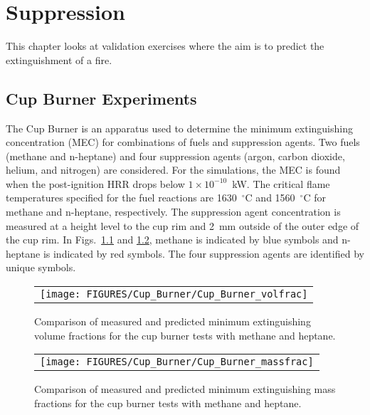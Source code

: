 
\chapter{Suppression}

This chapter looks at validation exercises where the aim is to predict the extinguishment of a fire.

\section{Cup Burner Experiments}

The Cup Burner is an apparatus used to determine the minimum extinguishing concentration (MEC) for combinations of fuels and suppression agents. Two fuels (methane and n-heptane) and four suppression agents (argon, carbon dioxide, helium, and nitrogen) are considered. For the simulations, the MEC is found when the post-ignition HRR drops below $1 \times 10^{-10}$~kW. The critical flame temperatures specified for the fuel reactions are 1630~$^\circ$C and 1560~$^\circ$C for methane and n-heptane, respectively. The suppression agent concentration is measured at a height level to the cup rim and 2~mm outside of the outer edge of the cup rim. In Figs.~\ref{cup_burner_extinguish_vol} and \ref{cup_burner_extinguish_mass}, methane is indicated by blue symbols and n-heptane is indicated by red symbols. The four suppression agents are identified by unique symbols.

\newpage

\begin{figure}[t]
\begin{center}
\begin{tabular}{c}
\texttt{[image: FIGURES/Cup\_Burner/Cup\_Burner\_volfrac]}
\end{tabular}
\end{center}
\caption[Results of Cup Burner experiments with methane and heptane]{Comparison of measured and predicted minimum extinguishing volume fractions for the cup burner tests with methane and heptane.}
\label{cup_burner_extinguish_vol}
\end{figure}


\begin{figure}[b]
\begin{center}
\begin{tabular}{c}
\texttt{[image: FIGURES/Cup\_Burner/Cup\_Burner\_massfrac]}
\end{tabular}
\end{center}
\caption[Results of Cup Burner experiments with methane and heptane]{Comparison of measured and predicted minimum extinguishing mass fractions for the cup burner tests with methane and heptane.}
\label{cup_burner_extinguish_mass}
\end{figure}

